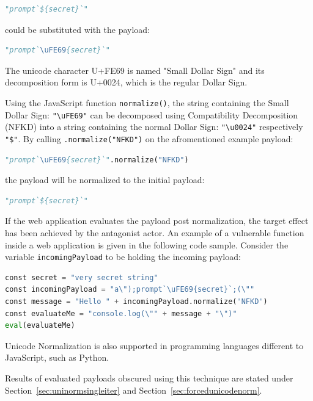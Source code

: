 \begin{lstlisting}[style=basicStyle, language=Python]
"prompt`${secret}`"
\end{lstlisting}

could be substituted with the payload:

\begin{lstlisting}[style=basicStyle, language=Python]
"prompt`\uFE69{secret}`"
\end{lstlisting}

The unicode character U+FE69 is named "Small Dollar Sign" and its decomposition form is U+0024, which is the regular Dollar Sign. \cite{comp/uni}

Using the JavaScript function \verb|normalize()|, the string containing the Small Dollar Sign: \verb|"\uFE69"| can be decomposed using Compatibility Decomposition (NFKD) into a string containing the normal Dollar Sign: \verb|"\u0024"| respectively \verb|"$"|.
By calling \verb|.normalize("NFKD")| on the afromentioned example payload:

\begin{lstlisting}[style=basicStyle, language=Python]
"prompt`\uFE69{secret}`".normalize("NFKD")
\end{lstlisting}

the payload will be normalized to the initial payload:

\begin{lstlisting}[style=basicStyle, language=Python]
"prompt`${secret}`"
\end{lstlisting}

If the web application evaluates the payload post normalization, the target effect has been achieved by the antagonist actor. An example of a vulnerable function inside a web application is given in the following code sample. Consider the variable \verb|incomingPayload| to be holding the incoming payload:

\begin{lstlisting}[style=basicStyle, language=Python]
const secret = "very secret string"
const incomingPayload = "a\");prompt`\uFE69{secret}`;(\""
const message = "Hello " + incomingPayload.normalize('NFKD')
const evaluateMe = "console.log(\"" + message + "\")"
eval(evaluateMe)
\end{lstlisting}

Unicode Normalization is also supported in programming languages different to JavaScript, such as Python. \cite{python/normalization}

Results of evaluated payloads obscured using this technique are stated under Section~\ref{sec:uninormsingleiter} and Section~\ref{sec:forcedunicodenorm}.


